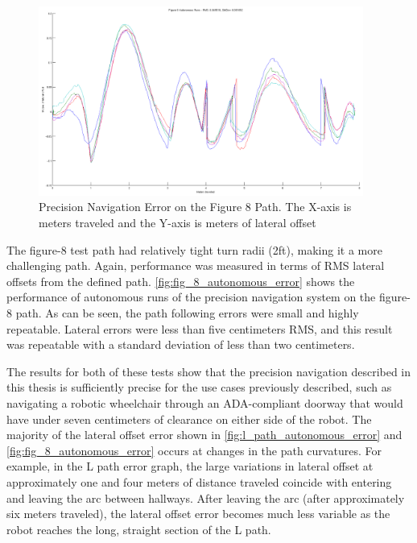 \begin{figure}
\centering
\includegraphics[width=0.95\textwidth]{images/fig_8_autonomous_error}
\caption[Precision Navigation Error on the Figure 8 Path]{Precision Navigation Error on the Figure 8 Path. The X-axis is meters traveled and the Y-axis is meters of lateral offset}
\label{fig:fig_8_autonomous_error}
\end{figure}

The figure-8 test path had relatively tight turn radii (2ft), making it a more challenging path. Again, performance was measured in terms of RMS lateral offsets from the defined path. \autoref{fig:fig_8_autonomous_error} shows the performance of autonomous runs of the precision navigation system on the figure-8 path. As can be seen, the path following errors were small and highly repeatable. Lateral errors were less than five centimeters RMS, and this result was repeatable with a standard deviation of less than two centimeters.

The results for both of these tests show that the precision navigation described in this thesis is sufficiently precise for the use cases previously described, such as navigating a robotic wheelchair through an ADA-compliant doorway that would have under seven centimeters of clearance on either side of the robot. The majority of the lateral offset error shown in \autoref{fig:l_path_autonomous_error} and \autoref{fig:fig_8_autonomous_error} occurs at changes in the path curvatures. For example, in the L path error graph, the large variations in lateral offset at approximately one and four meters of distance traveled coincide with entering and leaving the arc between hallways. After leaving the arc (after approximately six meters traveled), the lateral offset error becomes much less variable as the robot reaches the long, straight section of the L path.

